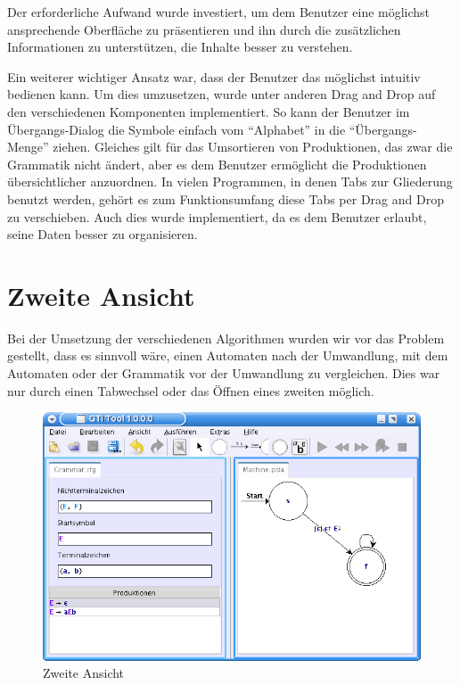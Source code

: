 Der erforderliche Aufwand wurde investiert, um dem Benutzer eine möglichst
ansprechende Oberfläche zu präsentieren und ihn durch die zusätzlichen
Informationen zu unterstützen, die Inhalte besser zu verstehen.\vspace{10pt}

Ein weiterer wichtiger Ansatz war, dass der Benutzer das \gtitool möglichst
intuitiv bedienen kann. Um dies umzusetzen, wurde unter anderen Drag and Drop
auf den verschiedenen Komponenten implementiert. So kann der Benutzer im
Übergangs-Dialog die Symbole einfach vom "`Alphabet"' in die
"`Übergangs-Menge"' ziehen. Gleiches gilt für das Umsortieren von Produktionen,
das zwar die Grammatik nicht ändert, aber es dem Benutzer ermöglicht die
Produktionen übersichtlicher anzuordnen. In vielen Programmen, in denen Tabs
zur Gliederung benutzt werden, gehört es zum Funktionsumfang diese Tabs per Drag
and Drop zu verschieben. Auch dies wurde implementiert, da es dem Benutzer
erlaubt, seine Daten besser zu organisieren.


\section{Zweite Ansicht}

Bei der Umsetzung der verschiedenen Algorithmen wurden wir vor das Problem
gestellt, dass es sinnvoll wäre, einen Automaten nach der Umwandlung, mit dem
Automaten oder der Grammatik vor der Umwandlung zu vergleichen. Dies war nur
durch einen Tabwechsel oder das Öffnen eines zweiten \gtitools
möglich.\vspace{10pt}

\begin{figure}[h!]
\begin{center}
\includegraphics[width=12cm]{../images/second_view.png}
\caption{Zweite Ansicht}
\end{center}
\end{figure}

